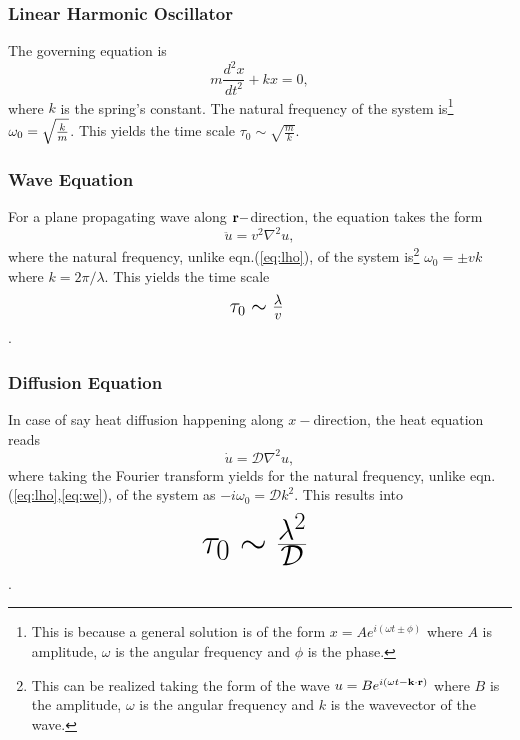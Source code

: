 \documentclass[onecolumn,12pt]{article}
\begin{document}
\subsubsection{Linear Harmonic Oscillator}
The governing equation is
\begin{equation}
\label{eq:lho}
\boxed{m \frac{d^2x}{dt^2} + kx = 0}, 
\end{equation}
where $k$ is the spring's constant. The natural frequency of the system is\footnote{\textcolor{alizarin}{This is because a general solution is of the form $x = Ae^{i(\omega t \pm \phi)}$ where $A$ is amplitude, $\omega$ is the angular frequency and $\phi$ is the phase.}} 
$\omega_0 = \sqrt{k \over m}$. This yields the time scale $\tau_0 \sim \sqrt{\frac{m}{k}}$. 

\subsubsection{Wave Equation}
For a plane propagating wave along ${\bf r}-$direction, the equation takes the form
\begin{equation}
\label{eq:we}
\boxed{\ddot{u} = v^2 \nabla^2 u},
\end{equation}
where the natural frequency, unlike eqn.(\ref{eq:lho}), of the system is\footnote{This can be realized taking the form of the wave $u = Be^{i(\omega t-{\bf k}\cdot {\bf r})}$ where $B$ is the amplitude, $\omega$ is the angular frequency and $k$ is the wavevector of the wave.} $\omega_0 = \pm vk$ where $k = 2\pi/\lambda$. This yields the time scale $$ \mbox{\Large $\tau_0 \sim {\lambda \over v}$ }$$. 

\subsubsection{Diffusion Equation}
In case of say heat diffusion happening along $x-$direction, the heat equation reads
\begin{equation}
\label{eq:de}
\boxed{\dot{u} = \mathcal{D} \nabla^2 u}, 
\end{equation}
where taking the Fourier transform yields for the natural frequency, unlike eqn.(\ref{eq:lho},\ref{eq:we}), of the system as $-i\omega_0 = \mathcal{D} k^2$. This results into $$ \mbox{\Huge $\tau_0 \sim {\lambda^2 \over \mathcal{D}}$ }$$.
\end{document}
